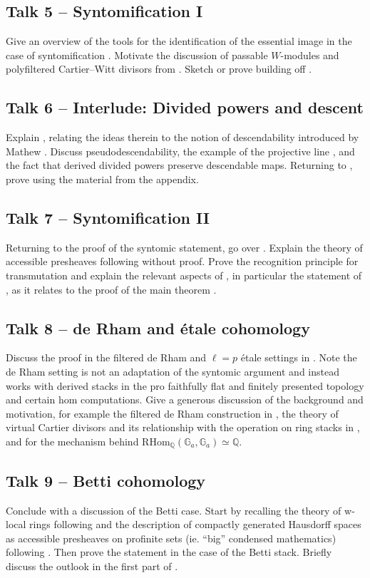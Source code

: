 \documentclass[12pt]{amsart}
\theoremstyle{definition}
\begin{document}
\subsection*{Talk 5 -- Syntomification I} 
Give an overview of the tools for the identification of the essential image in the case of syntomification \cite[\S 1.3-1.5]{LM25}. Motivate the discussion of passable $W$-modules and polyfiltered Cartier--Witt divisors from \cite[\S 5.1-5.3]{Bha22}. Sketch or prove \cite[Prop. 1.5.8]{LM25} building off \cite[Thm. A.1]{Mat23}.
\subsection*{Talk 6 -- Interlude: Divided powers and descent} 
Explain \cite[\S 1.6 \& App. A]{LM25}, relating the ideas therein to the notion of descendability introduced by Mathew \cite{Mat16}. Discuss pseudodescendability, the example of the projective line \cite[Rmk. A.3]{LM25}, and the fact that derived divided powers preserve descendable maps. Returning to \cite[\S 1.6]{LM25}, prove \cite[Prop. 1.6.1]{LM25} using the material from the appendix. 
\subsection*{Talk 7 -- Syntomification II} 
Returning to the proof of the syntomic statement, go over \cite[\S 1.7 \& App. D]{LM25}. Explain the theory of accessible presheaves following \cite[App. A]{HP24} without proof. Prove the recognition principle for transmutation \cite[Prop. D.2]{LM25} and explain the relevant aspects of \cite[\S 8.4]{Dri22}, in particular the statement of \cite[Thm. 8.4.7]{Dri22}, as it relates to the proof of the main theorem \cite[Thm. 1.7.4]{LM25}. 
\subsection*{Talk 8 -- de Rham and \'{e}tale cohomology} 
Discuss the proof in the filtered de Rham and $\ell=p$ \'{e}tale settings in \cite[\S 2-3]{LM25}. Note the de Rham setting is not an adaptation of the syntomic argument and instead works with derived stacks in the pro faithfully flat and finitely presented topology and certain hom computations. Give a generous discussion of the background and motivation, for example the filtered de Rham construction in \cite[\S 6.4]{GM26}, the theory of virtual Cartier divisors and its relationship with the operation on ring stacks in \cite[\S 3.2]{KR25}, and \cite[Prop. A.6 \& A.15]{Mat23} for the mechanism behind $\mathrm{RHom}_{\mathbb{Q}}(\mathbb{G}_{a},\mathbb{G}_{a})\simeq\mathbb{Q}$. 
\subsection*{Talk 9 -- Betti cohomology} 
Conclude with a discussion of the Betti case. Start by recalling the theory of w-local rings following \cite{BS15} and the description of compactly generated Hausdorff spaces as accessible presheaves on profinite sets (ie. ``big'' condensed mathematics) following \cite{Sch19}. Then prove the statement in the case of the Betti stack. Briefly discuss the outlook in the first part of \cite[\S 5]{LM25}.

\newpage
\printbibliography
\end{document}
